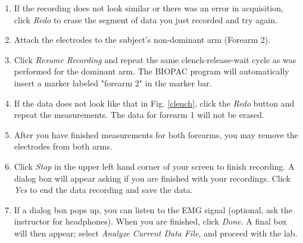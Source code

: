 \documentclass{article}
\begin{document}
\begin{enumerate}
	\item If the recording does not look similar or there was an error in acquisition, click \textit{Redo} to erase the segment of data you just recorded and try again.
	\item Attach the electrodes to the subject's non-dominant arm (Forearm 2).
	\item Click \textit{Resume Recording} and repeat the same clench-release-wait cycle as was performed for the dominant arm. The BIOPAC program will automatically insert a marker labeled "forearm 2" in the marker bar.
	\item If the data does not look like that in Fig. \ref{clench}, click the \textit{Redo} button and repeat the measurements. The data for forearm 1 will not be erased.
	\item After you have finished measurements for both forearms, you may remove the electrodes from both arms.
	\item Click \textit{Stop} in the upper left hand corner of your screen to finish recording. A dialog box will appear asking if you are finished with your recordings. Click \textit{Yes} to end the data recording and save the data.
	\item If a dialog box pops up, you can listen to the EMG signal (optional, ask the instructor for headphones). When you are finished, click \textit{Done}. A final box will then appear; select \textit{Analyze Current Data File}, and proceed with the lab.
\end{enumerate}
\end{document}
